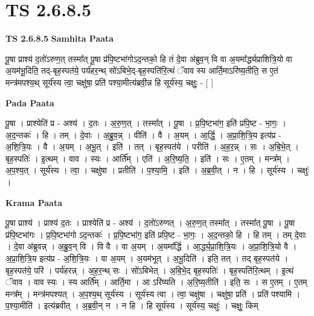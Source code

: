 \documentclass[17pt]{extarticle}
\begin{document}
\section{ TS 2.6.8.5 }

\textbf{TS 2.6.8.5 } \newline
\textbf{Samhita Paata} \newline

पू॒षा प्राश्य॑ द॒तो॑ऽरुण॒त् तस्मा᳚त् पू॒षा प्र॑पि॒ष्टभा॑गोऽद॒न्तको॒ हि तं दे॒वा अ॑ब्रुव॒न् वि वा अ॒यमा᳚र्द्ध्यप्राशित्रि॒यो वा अ॒यम॑भू॒दिति॒ तद्-बृह॒स्पत॑ये॒ पर्य॑हर॒न्थ् सो॑ऽबिभे॒द्-बृह॒स्पति॑रि॒त्थं ॅवाव स्य आर्ति॒माऽरि॑ष्य॒तीति॒ स ए॒तं मन्त्र॑मपश्य॒थ् सूर्य॑स्य त्वा॒ चक्षु॑षा॒ प्रति॑ पश्या॒मीत्य॑ब्रवी॒न्न हि सूर्य॑स्य॒ चक्षुः॒ - [  ] \newline

\textbf{Pada Paata} \newline

पू॒षा । प्राश्येति॑ प्र - अश्य॑ । द॒तः । अ॒रु॒ण॒त् । तस्मा᳚त् । पू॒षा । प्र॒पि॒ष्टभा॑ग॒ इति॑ प्रपि॒ष्ट - भा॒गः॒ । अ॒द॒न्तकः॑ । हि । तम् । दे॒वाः । अ॒ब्रु॒व॒न्न् । वीति॑ । वै । अ॒यम् । आ॒र्द्धि॒ । अ॒प्रा॒शि॒त्रि॒य इत्य॑प्र - अ॒शि॒त्रि॒यः । वै । अ॒यम् । अ॒भू॒त् । इति॑ । तत् । बृह॒स्पत॑ये । परीति॑ । अ॒ह॒र॒न्न् । सः । अ॒बि॒भे॒त् । बृह॒स्पतिः॑ । इ॒त्थम् । वाव । स्यः । आर्ति᳚म् । एति॑ । अ॒रि॒ष्य॒ति॒ । इति॑ । सः । ए॒तम् । मन्त्र᳚म् । अ॒प॒श्य॒त् । सूर्य॑स्य । त्वा॒ । चक्षु॑षा । प्रतीति॑ । प॒श्या॒मि॒ । इति॑ । अ॒ब्र॒वी॒त् । न । हि । सूर्य॑स्य । चक्षुः॑ ।  \newline


\textbf{Krama Paata} \newline

पू॒षा प्राश्य॑ । प्राश्य॑ द॒तः । प्राश्येति॑ प्र - अश्य॑ । द॒तो॑ऽरुणत् । अ॒रु॒ण॒त् तस्मा᳚त् । तस्मा᳚त् पू॒षा । पू॒षा प्र॑पि॒ष्टभा॑गः । प्र॒पि॒ष्टभा॑गो ऽद॒न्तकः॑ । प्र॒पि॒ष्टभा॑ग॒ इति॑ प्रपि॒ष्ट - भा॒गः॒ । अ॒द॒न्तको॒ हि । हि तम् । तम् दे॒वाः । दे॒वा अ॑ब्रुवन्न् । अ॒ब्रु॒व॒न् वि । वि वै । वा अ॒यम् । अ॒यमा᳚र्द्धि । आ॒र्द्ध्य॒प्रा॒शि॒त्रि॒यः । अ॒प्रा॒शि॒त्रि॒यो वै । अ॒प्रा॒शि॒त्रि॒य इत्य॑प्र - अ॒शि॒त्रि॒यः । वा अ॒यम् । अ॒यम॑भूत् । अ॒भू॒दिति॑ । इति॒ तत् । तद् बृह॒स्पत॑ये । बृह॒स्पत॑ये॒ परि॑ । पर्य॑हरन्न् । अ॒ह॒र॒न्थ् सः । सो॑ऽबिभेत् । अ॒बि॒भे॒द् बृह॒स्पतिः॑ । बृह॒स्पति॑रि॒त्थम् । इ॒त्थं ॅवाव । वाव स्यः । स्य आर्ति᳚म् । आर्ति॒मा । आ ऽरि॑ष्यति । अ॒रि॒ष्य॒तीति॑ । इति॒ सः । स ए॒तम् । ए॒तम् मन्त्र᳚म् । मन्त्र॑मपश्यत् । अ॒प॒श्य॒थ् सूर्य॑स्य । सूर्य॑स्य त्वा । त्वा॒ चक्षु॑षा । चक्षु॑षा॒ प्रति॑ । प्रति॑ पश्यामि । प॒श्या॒मीति॑ । इत्य॑ब्रवीत् । अ॒ब्र॒वी॒न् न । न हि । हि सूर्य॑स्य । सूर्य॑स्य॒ चक्षुः॑ । चक्षुः॒ किम् \newline
\end{document}
